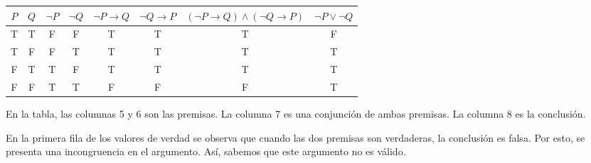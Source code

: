 \documentclass[10pt]{report}
\begin{document}
\begin{enumerate}
	
	\begin{center}
	
            \begin{tabular}{ |c|c|c|c|c|c|c|c| }
             \hline 
             $P$ & $Q$ & $\neg P$ & $\neg Q$ & $\neg P \rightarrow Q$ & $\neg Q \rightarrow P$ & $(\neg P \rightarrow Q) \land (\neg Q \rightarrow P)$ & $\neg P \lor \neg Q$\\  [0.5ex] 
                \hline
             T & T & F & F & T & T & T & F\\ 
             T & F & F & T & T & T & T & T\\ 
             F & T & T & F & T & T & T & T\\ 
             F & F & T & T & F & F & F & T\\ 
             \hline
            \end{tabular}
    
    \end{center}
    
    En la tabla, las columnas 5 y 6 son las premisas. La columna 7 es una conjunción de ambas premisas. La columna 8 es la conclusión.
    
    
    
    En la primera fila de los valores de verdad se observa que cuando las dos premisas son verdaderas, la conclusión es falsa. Por esto, se presenta una incongruencia en el argumento. Así, sabemos que este argumento no es válido.
	
	
\end{enumerate}
\end{document}
